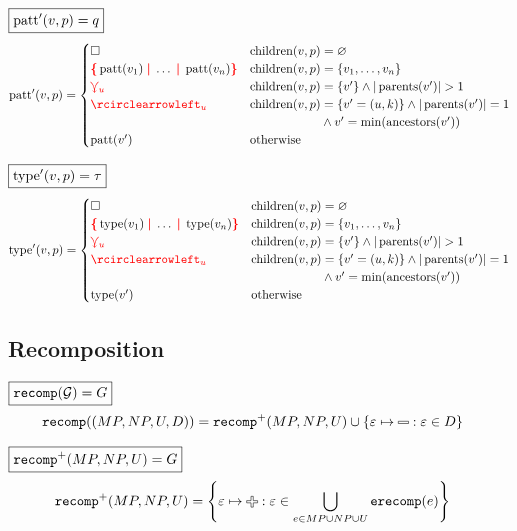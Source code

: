 \noindent $\boxed{\operatorname{\text{patt}}'(v, p) = q}$
%
\begin{align*}
  \patt'(v,p) = \begin{cases}
    \hole & \children(v,p) = \varnothing \\
    \conflictHole{\patt(v_1),\ldots,\patt(v_n)} & \children(v,p) = \SetOf{v_1, \ldots, v_n} \\
    \multiVertex{u} & \children(v,p) = \SetOf{v'} \land |\parents(v')| > 1 \\
    \cycleVertex{u} & \children(v,p) = \SetOf{v'=(u,k)} \land |\parents(v')| = 1 \\
        & \phantom{\children(v,p)} \land v' = \min(\ancestors(v')) \\
    \patt(v') & \text{otherwise} \\
  \end{cases}
\end{align*}

\noindent $\boxed{\operatorname{\text{type}}'(v, p) = \tau}$
%
\begin{align*}
  \type'(v,p) = \begin{cases}
    \hole & \children(v,p) = \varnothing \\
    \conflictHole{\type(v_1),\ldots,\type(v_n)} & \children(v,p) = \SetOf{v_1, \ldots, v_n} \\
    \multiVertex{u} & \children(v,p) = \SetOf{v'} \land |\parents(v')| > 1 \\
    \cycleVertex{u} & \children(v,p) = \SetOf{v' = (u,k)} \land |\parents(v')| = 1 \\
        & \phantom{\children(v,p)} \land v' = \min(\ancestors(v')) \\
    \type(v') & \text{otherwise} \\
  \end{cases}
\end{align*}


\subsection{Recomposition}

\noindent $\boxed{\operatorname{\texttt{recomp}}\mathopen{}\left(\mathcal{G}\right)\mathclose{} = G}$
%
\begin{align*}
  \recomp{(MP, NP, U, D)} &= \recompPlus{MP, NP, U} \cup \SetOf{\e \mapsto \Minus \SuchThat{\e \in D}}
\end{align*}

\noindent $\boxed{\operatorname{\texttt{recomp}^{+}}\mathopen{}\left(MP, NP, U\right)\mathclose{} = G}$
%
\begin{align*}
  \recompPlus{MP, NP, U} &= \SetOf{\e \mapsto \Plus \SuchThat{\e \in \bigcup_{e \in MP \cup NP \cup U} \erecomp{e}}}
\end{align*}

